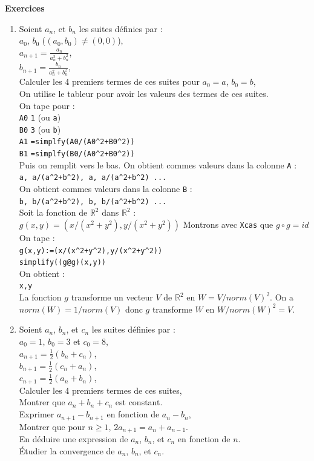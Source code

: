 \documentclass[a4paper,11pt]{book}
\newcommand{\R}{{\mathbb{R}}}
\begin{document}
{\bf Exercices}
\begin{enumerate}
\item Soient $a_n$, et $b_n$ les suites d\'efinies par :\\
$a_0$, $b_0$ ($(a_0,b_0)\neq (0,0)$),\\
$a_{n+1}=\frac{a_n}{a_n^2+b_n^2}$,\\
$b_{n+1}=\frac{b_n}{a_n^2+b_n^2}$,\\
Calculer les 4 premiers termes de ces suites pour $a_0=a$, $b_0=b$,\\
On utilise le tableur pour avoir les valeurs des termes de ces suites.\\
On tape pour :\\
{\tt A0} {\tt 1} (ou {\tt a})\\
{\tt B0} {\tt 3} (ou {\tt b})\\
{\tt A1} {\tt =simplfy(A0/(A0\verb|^|2+B0\verb|^|2))}\\
{\tt B1} {\tt =simplfy(B0/(A0\verb|^|2+B0\verb|^|2))}\\
Puis on remplit vers le bas.
On obtient commes valeurs dans la colonne {\tt A} :\\
{\tt a, a/(a\verb|^|2+b\verb|^|2), a, a/(a\verb|^|2+b\verb|^|2) ...}\\
On obtient commes valeurs dans la colonne {\tt B} :\\
{\tt b, b/(a\verb|^|2+b\verb|^|2), b, b/(a\verb|^|2+b\verb|^|2) ...}\\
Soit  la fonction de $\R^2$ dans $\R^2$ : \\
$g(x,y)=(x/(x^2+y^2),y/(x^2+y^2))$
Montrons avec {\tt Xcas} que $g\circ g=id$\\
On tape :\\
{\tt g(x,y):=(x/(x\verb|^|2+y\verb|^|2),y/(x\verb|^|2+y\verb|^|2))}\\
{\tt simplify((g@g)(x,y))}\\
On obtient :\\
{\tt x,y}\\
La fonction $g$ transforme un vecteur $V$ de $\R^2$ en $W=V/norm(V)^2$.
On a $norm(W)=1/norm(V)$ donc $g$ transforme $W$ en $W/norm(W)^2=V$.

\item Soient $a_n$, $b_n$, et $c_n$ les suites d\'efinies par :\\
$a_0=1$, $b_0=3$ et $c_0=8$,\\
$a_{n+1}=\frac{1}{2}(b_n+c_n)$,\\
$b_{n+1}=\frac{1}{2}(c_n+a_n)$,\\
$c_{n+1}=\frac{1}{2}(a_n+b_n)$,\\
Calculer les 4 premiers termes de ces suites,\\
Montrer que $a_n+b_n+c_n$ est constant.\\
Exprimer $a_{n+1}-b_{n+1}$ en fonction de $a_n-b_n$,\\
Montrer que pour $n\geq 1$, $2a_{n+1}=a_n+a_{n-1}$.\\
En d\'eduire une expression de $a_n$, $b_n$, et $c_n$ en fonction de $n$.\\
\'Etudier la convergence de $a_n$, $b_n$, et $c_n$.\\


\end{enumerate}
\end{document}
